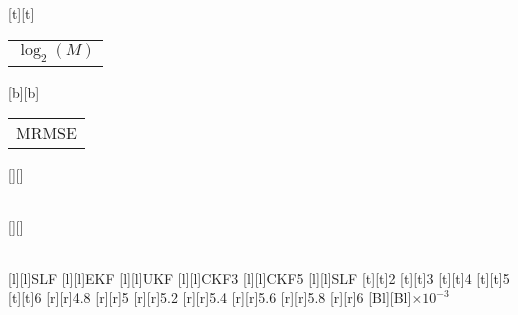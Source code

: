 %
%
[t][t]{\color[rgb]{0,0,0}\setlength{\tabcolsep}{0pt}\begin{tabular}{c}$\log_2 (M)$\end{tabular}}%
[b][b]{\color[rgb]{0,0,0}\setlength{\tabcolsep}{0pt}\begin{tabular}{c}MRMSE\end{tabular}}%
[][]{\color[rgb]{0,0,0}\setlength{\tabcolsep}{0pt}\begin{tabular}{c} \end{tabular}}%
[][]{\color[rgb]{0,0,0}\setlength{\tabcolsep}{0pt}\begin{tabular}{c} \end{tabular}}%
[l][l]{\color[rgb]{0,0,0}SLF}%
[l][l]{\color[rgb]{0,0,0}EKF}%
[l][l]{\color[rgb]{0,0,0}UKF}%
[l][l]{\color[rgb]{0,0,0}CKF3}%
[l][l]{\color[rgb]{0,0,0}CKF5}%
[l][l]{\color[rgb]{0,0,0}SLF}%
%
[t][t]{2}%
[t][t]{3}%
[t][t]{4}%
[t][t]{5}%
[t][t]{6}%
%
[r][r]{4.8}%
[r][r]{5}%
[r][r]{5.2}%
[r][r]{5.4}%
[r][r]{5.6}%
[r][r]{5.8}%
[r][r]{6}%
[Bl][Bl]{$\times 10^{-3}$}%
%
%
